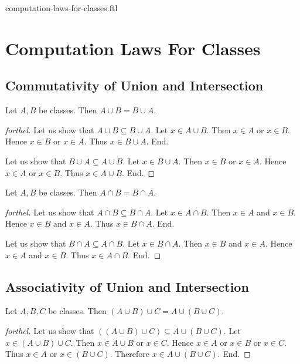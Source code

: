 \documentclass{naproche-library}
\begin{document}
\begin{smodule}{computation-laws-for-classes.ftl}

  \section*{Computation Laws For Classes}

  \subsection*{Commutativity of Union and Intersection}

  \begin{proposition}[forthel,id=FOUNDATIONS_02_8446177632583680,printid]
    Let $A, B$ be classes.
    Then $A \cup B = B \cup A$.
  \end{proposition}
  \begin{proof}[forthel]
    Let us show that $A \cup B \subseteq B \cup A$.
      Let $x \in A \cup B$.
      Then $x \in A$ or $x \in B$.
      Hence $x \in B$ or $x \in A$.
      Thus $x \in B \cup A$.
    End.

    Let us show that $B \cup A \subseteq A \cup B$.
      Let $x \in B \cup A$.
      Then $x \in B$ or $x \in A$.
      Hence $x \in A$ or $x \in B$.
      Thus $x \in A \cup B$.
    End.
  \end{proof}

  \begin{proposition}[forthel,id=FOUNDATIONS_02_7565102251245568,printid]
    Let $A, B$ be classes.
    Then $A \cap B = B \cap A$.
  \end{proposition}
  \begin{proof}[forthel]
    Let us show that $A \cap B \subseteq B \cap A$.
      Let $x \in A \cap B$.
      Then $x \in A$ and $x \in B$.
      Hence $x \in B$ and $x \in A$.
      Thus $x \in B \cap A$.
    End.

    Let us show that $B \cap A \subseteq A \cap B$.
      Let $x \in B \cap A$.
      Then $x \in B$ and $x \in A$.
      Hence $x \in A$ and $x \in B$.
      Thus $x \in A \cap B$.
    End.
  \end{proof}


  \subsection*{Associativity of Union and Intersection}

  \begin{proposition}[forthel,id=FOUNDATIONS_02_3854032263184384,printid]
    Let $A, B, C$ be classes.
    Then $(A \cup B) \cup C = A \cup (B \cup C)$.
  \end{proposition}
  \begin{proof}[forthel]
    Let us show that $((A \cup B) \cup C) \subseteq A \cup (B \cup C)$. %
      Let $x \in (A \cup B) \cup C$.
      Then $x \in A \cup B$ or $x \in C$.
      Hence $x \in A$ or $x \in B$ or $x \in C$.
      Thus $x \in A$ or $x \in (B \cup C)$.
      Therefore $x \in A \cup (B \cup C)$.
    End.


\end{proof}
\end{smodule}
\end{document}
